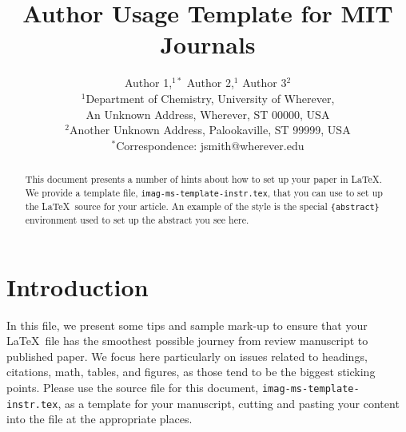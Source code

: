 \documentclass[]{imag-ms-template}
\title{Author Usage Template for MIT Journals}
\author{Author 1,$^{1\ast}$ Author 2,$^{1}$ Author 3$^{2}$\\
{\small $^{1}$Department of Chemistry, University of Wherever,}\\
{\small An Unknown Address, Wherever, ST 00000, USA}\\
{\small $^{2}$Another Unknown Address, Palookaville, ST 99999, USA}\\
{\small $^\ast$Correspondence:  jsmith@wherever.edu}
}
\begin{document}
 

\maketitle 



\begin{abstract}
  This document presents a number of hints about how to set up your
  paper in \LaTeX.  We provide a template file,
  \texttt{imag-ms-template-instr.tex}, that you can use to set up the
  \LaTeX\ source for your article.  An example of the style is the
  special \texttt{\{abstract\}} environment used to set up the
  abstract you see here.
\end{abstract}

\section{Introduction}

In this file, we present some tips and sample mark-up to ensure that your
\LaTeX\ file has the smoothest possible journey from review manuscript
to published paper.  We focus here particularly on
issues related to headings, citations, math, tables, and
figures, as those tend to be the biggest sticking points.  Please use
the source file for this document, \texttt{imag-ms-template-instr.tex}, as a template
for your manuscript, cutting and pasting your content into the file at
the appropriate places.



\end{document}
